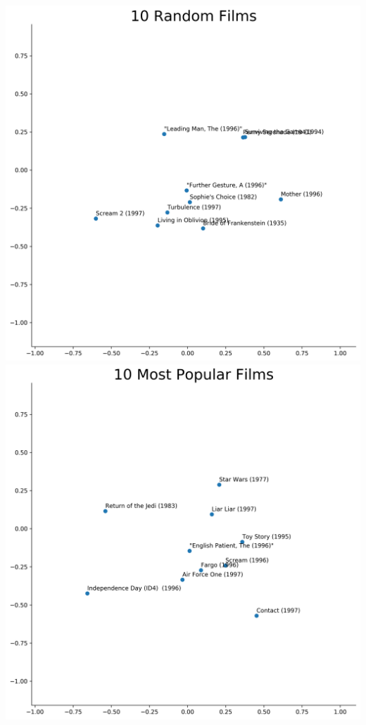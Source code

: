 \includegraphics[scale=0.35]{"10 Random Films"}
\includegraphics[scale=0.35]{"10 Most Popular Films"} \\ \\
